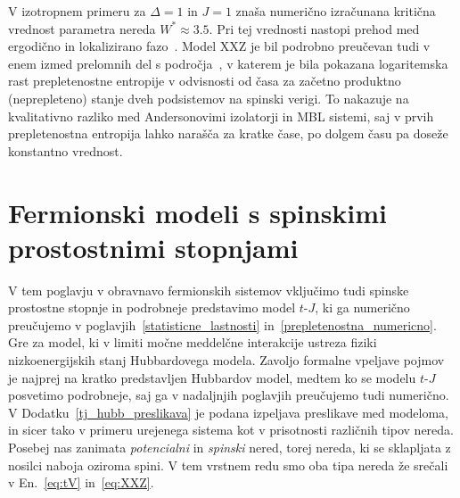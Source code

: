 \noindent
V izotropnem primeru za $\Delta=1$ in $J=1$ znaša numerično izračunana kritična vrednost parametra nereda $W^*\approx 3.5.$ Pri tej vrednosti nastopi prehod med ergodično in lokalizirano fazo~\cite{pal2010many}. Model XXZ je bil podrobno preučevan tudi v enem izmed prelomnih del s področja~\cite{vznidarivc2008many}, v katerem je bila pokazana logaritemska rast prepletenostne entropije v odvisnosti od časa za začetno produktno (neprepleteno) stanje dveh podsistemov na spinski verigi. To nakazuje na kvalitativno razliko med Andersonovimi izolatorji in MBL sistemi, saj v prvih prepletenostna entropija lahko narašča za kratke čase, po dolgem času pa doseže konstantno vrednost.  

\section{Fermionski modeli s spinskimi prostostnimi stopnjami}
\label{spinfull}
V tem poglavju v obravnavo fermionskih sistemov vključimo tudi spinske prostostne stopnje in podrobneje predstavimo model $t$-$J$, ki ga numerično preučujemo v poglavjih~\ref{statisticne_lastnosti} in~\ref{prepletenostna_numericno}. Gre za model, ki v limiti močne meddelčne interakcije ustreza fiziki nizkoenergijskih stanj Hubbardovega modela. Zavoljo formalne vpeljave pojmov je najprej na kratko predstavljen Hubbardov model, medtem ko se modelu $t$-$J$ posvetimo podrobneje, saj ga v nadaljnjih poglavjih preučujemo tudi numerično. V Dodatku~\ref{tj_hubb_preslikava} je podana izpeljava preslikave med modeloma, in sicer tako v primeru urejenega sistema kot v prisotnosti različnih tipov nereda.  Posebej nas zanimata \emph{potencialni} in \emph{spinski} nered, torej nereda, ki se sklapljata z nosilci naboja oziroma spini. V tem vrstnem redu smo oba tipa nereda že srečali v En.~\eqref{eq:tV} in~\eqref{eq:XXZ}.\\\\
